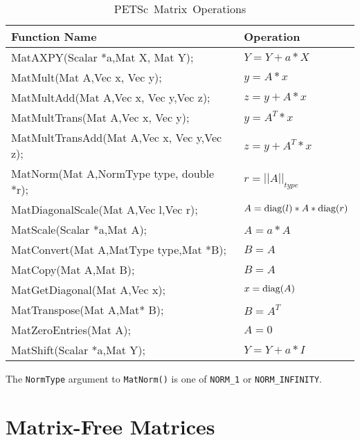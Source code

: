 \begin{table}[H]
\begin{center}
\begin{tabular}{ll}
{\bf Function Name} & {\bf Operation} \\
\hline
MatAXPY(Scalar *a,Mat X, Mat Y); & $ Y = Y + a*X $ \\
MatMult(Mat A,Vec x, Vec y); & $ y = A*x $ \\
MatMultAdd(Mat A,Vec x, Vec y,Vec z); & $ z = y + A*x $ \\
MatMultTrans(Mat A,Vec x, Vec y); & $ y = A^{T}*x $ \\
MatMultTransAdd(Mat A,Vec x, Vec y,Vec z); & $ z = y + A^{T}*x $ \\
MatNorm(Mat A,NormType type,  double *r); & $ r = ||A||_{type}$ \\
MatDiagonalScale(Mat A,Vec l,Vec r); & $ A = \hbox{diag}(l)*A*\hbox{diag}(r) $ \\
MatScale(Scalar *a,Mat A); & $ A = a*A $ \\
MatConvert(Mat A,MatType type,Mat *B); & $ B = A $ \\
MatCopy(Mat A,Mat B); &  $ B = A $ \\
MatGetDiagonal(Mat A,Vec x); & $ x = \hbox{diag}(A)$ \\
MatTranspose(Mat A,Mat* B); & $ B = A^{T} $ \\
MatZeroEntries(Mat A); & $ A = 0 $ \\
MatShift(Scalar *a,Mat Y); & $ Y =  Y + a*I $ \\
\hline 
\end{tabular}
\end{center}
\caption{\hbox{PETSc Matrix Operations}}
\label{fig:matrixops}
\end{table}
The {\tt NormType} argument to {\tt MatNorm()} is one of 
 {\tt NORM\_1} or {\tt NORM\_INFINITY}.
  
 

\section{Matrix-Free Matrices} 

